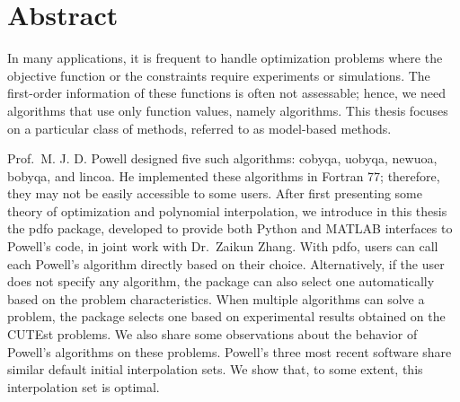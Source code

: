 %
%
%
\chapter*{Abstract}
\label{ch:abstract}

In many applications, it is frequent to handle optimization problems where the objective function or the constraints require experiments or simulations.
The first-order information of these functions is often not assessable; hence, we need algorithms that use only function values, namely  algorithms.
This thesis focuses on a particular class of  methods, referred to as model-based methods.

Prof.\ M. J. D. Powell designed five such algorithms: \gls{cobyqa}, \gls{uobyqa}, \gls{newuoa}, \gls{bobyqa}, and \gls{lincoa}.
He implemented these algorithms in Fortran 77; therefore, they may not be easily accessible to some users.
After first presenting some theory of optimization and polynomial interpolation, we introduce in this thesis the \gls{pdfo} package, developed to provide both Python and MATLAB interfaces to Powell's code, in joint work with Dr.\ Zaikun Zhang.
With \gls{pdfo}, users can call each Powell's algorithm directly based on their choice.
Alternatively, if the user does not specify any algorithm, the package can also select one automatically based on the problem characteristics.
When multiple algorithms can solve a problem, the package selects one based on experimental results obtained on the CUTEst problems.
We also share some observations about the behavior of Powell's algorithms on these problems.
Powell's three most recent software share similar default initial interpolation sets.
We show that, to some extent, this interpolation set is optimal.

